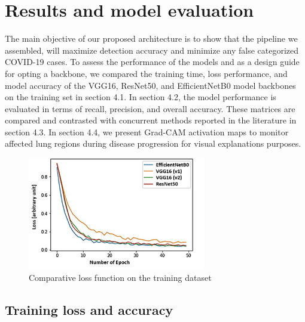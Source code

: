 \section{Results and model evaluation}
\label{sec:results}

The main objective of our proposed architecture is to show that the pipeline we assembled, will maximize detection accuracy and minimize any false categorized COVID-19 cases. To assess the performance of the models and as a design guide for opting a backbone, we compared  the training time, loss performance, and model accuracy of  the VGG16, ResNet50, and EfficientNetB0 model backbones on the training set in section 4.1.  In section 4.2, the model performance is evaluated in terms of recall, precision, and overall accuracy. These matrices are compared and contrasted with concurrent methods reported in the literature in section 4.3.  In section 4.4, we present Grad-CAM activation maps to monitor affected lung regions during disease progression for visual explanations purposes. 

\begin{figure} [h!]
\centering
\includegraphics[width=0.69\textwidth]{images/Loss_edit.png}
   \caption{Comparative loss function on the training dataset}
\label{fig:loss}
\end{figure}

\subsection{Training loss and accuracy}

